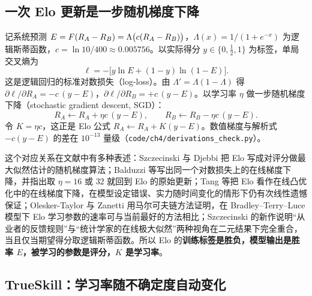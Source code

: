 \subsection{一次 Elo 更新是一步随机梯度下降}

\begin{derivbox}[Elo 更新 = 对数损失上的一步 SGD]
记系统预测 $E=F(R_A-R_B)=\Lambda\big(c(R_A-R_B)\big)$，$\Lambda(x)=1/(1+e^{-x})$ 为逻辑斯蒂函数，$c=\ln 10/400\approx0.005756$。以实际得分 $y\in\{0,\tfrac12,1\}$ 为标签，单局交叉熵为
\[
\ell=-\bigl[y\ln E+(1-y)\ln(1-E)\bigr].
\]
这是逻辑回归的标准对数损失（log-loss）。由 $\Lambda'=\Lambda(1-\Lambda)$ 得 $\partial\ell/\partial R_A=-c\,(y-E)$，$\partial\ell/\partial R_B=+c\,(y-E)$。以学习率 $\eta$ 做一步随机梯度下降（stochastic gradient descent, SGD）：
\begin{equation}
R_A\leftarrow R_A+\eta c\,(y-E),\qquad R_B\leftarrow R_B-\eta c\,(y-E).
\label{eq:ch4-elo-sgd}
\end{equation}
令 $K=\eta c$，这正是 Elo 公式\cite{elo1978rating} $R_A\leftarrow R_A+K(y-E)$。数值梯度与解析式 $-c(y-E)$ 的差在 $10^{-13}$ 量级\tagOwn（\texttt{code/ch4/derivations\_check.py}）。
\end{derivbox}

这个对应关系在文献中有多种表述：Szczecinski 与 Djebbi 把 Elo 写成对评分做最大似然估计的随机梯度算法\cite{szczecinski2019understanding}\tagLit；Balduzzi 等写出同一个对数损失上的在线梯度下降，并指出取 $\eta=16$ 或 $32$ 就回到 Elo 的原始更新\cite{balduzzi2018reevaluating}\tagLit；Tang 等把 Elo 看作在线凸优化中的在线梯度下降，在模型设定错误、实力随时间变化的情形下仍有次线性遗憾保证\cite{tang2025elo}\tagLit；Olesker-Taylor 与 Zanetti 用马尔可夫链方法证明，在 Bradley–Terry–Luce 模型下 Elo 学习参数的速率可与当前最好的方法相比\cite{oleskertaylor2024analysis}\tagLit；Szczecinski 的新作说明“从业者的反馈规则”与“统计学家的在线极大似然”两种视角在二元结果下完全重合，当且仅当期望得分取逻辑斯蒂函数\cite{szczecinski2026new}\tagLit。所以 Elo 的\textbf{训练标签是胜负，模型输出是胜率 $E$，被学习的参数是评分，$K$ 是学习率}。

\subsection{TrueSkill：学习率随不确定度自动变化}
\label{sec:ch4-trueskill}

